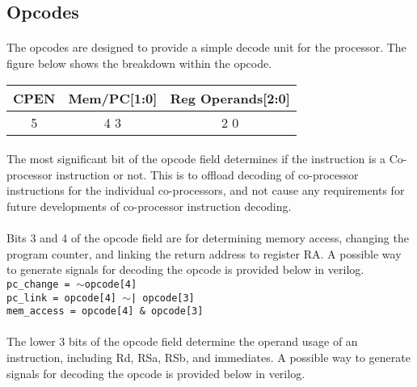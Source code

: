 \documentclass[letterpaper, 11pt]{article}
\begin{document}
\newpage
\subsection{Opcodes}
\paragraph{} The opcodes are designed to provide a simple decode unit for the processor. The figure below shows the breakdown
within the opcode.
	\begin{center}
		\begin{tabular}{|c|c|c|}
			\hline
				CPEN & Mem/PC[1:0] & Reg Operands[2:0]	\\ \hline
				5 & 4 \hfill 3 & 2 \hfill 0 \\ \hline

		\end{tabular}
	\end{center}
\paragraph{} The most significant bit of the opcode field determines if the instruction is a Co-processor instruction or not.
This is to offload decoding of co-processor instructions for the individual co-processors, and not cause any requirements
for future developments of co-processor instruction decoding. 
\paragraph{} Bits 3 and 4 of the opcode field are for determining memory access, changing the program counter, and linking
the return address to register RA. A possible way to generate signals for decoding the opcode is provided below in verilog. \\

{\parindent0pt %
\texttt{pc\_change = $\sim$opcode[4]}\\
\texttt{pc\_link = opcode[4] $\sim$| opcode[3]}\\
\texttt{mem\_access = opcode[4] \& opcode[3]}\\
}%

\paragraph{} The lower 3 bits of the opcode field determine the operand usage of an instruction, including Rd, RSa, RSb, and immediates.
A possible way to generate signals for decoding the opcode is provided below in verilog. \\
\end{document}
